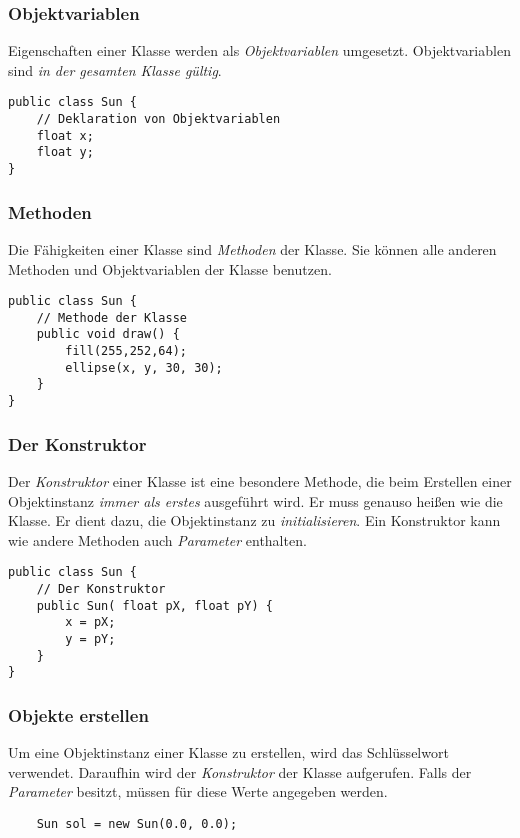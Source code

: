 \documentclass[10pt, a4paper]{arbeitsblatt}
\begin{document}
\begin{multicols}{2}
\subsubsection*{Objektvariablen}
Eigenschaften einer Klasse werden als \emph{Objektvariablen} umgesetzt. Objektvariablen sind \emph{in der gesamten Klasse gültig}.
\begin{verbatim}
public class Sun {
	// Deklaration von Objektvariablen
	float x;
	float y;
}
\end{verbatim}

\subsubsection*{Methoden}
Die Fähigkeiten einer Klasse sind \emph{Methoden} der Klasse. Sie können alle anderen Methoden und Objektvariablen der Klasse benutzen.
\begin{verbatim}
public class Sun {
	// Methode der Klasse
	public void draw() {
		fill(255,252,64);
		ellipse(x, y, 30, 30);
	}
}
\end{verbatim}

\columnbreak
\subsubsection*{Der Konstruktor}
Der \emph{Konstruktor} einer Klasse ist eine besondere Methode, die beim Erstellen einer Objektinstanz \emph{immer als erstes} ausgeführt wird. Er muss genauso heißen wie die Klasse. Er dient dazu, die Objektinstanz zu \emph{initialisieren}. Ein Konstruktor kann wie andere Methoden auch \emph{Parameter} enthalten.
\begin{verbatim}
public class Sun {
	// Der Konstruktor
	public Sun( float pX, float pY) {
		x = pX;
		y = pY;
	}
}
\end{verbatim}

\subsubsection*{Objekte erstellen}
Um eine Objektinstanz einer Klasse zu erstellen, wird das Schlüsselwort  verwendet. Daraufhin wird der \emph{Konstruktor} der Klasse aufgerufen. Falls der \emph{Parameter} besitzt, müssen für diese Werte angegeben werden.
\begin{verbatim}
	Sun sol = new Sun(0.0, 0.0);
\end{verbatim}
\end{multicols}
\end{document}
